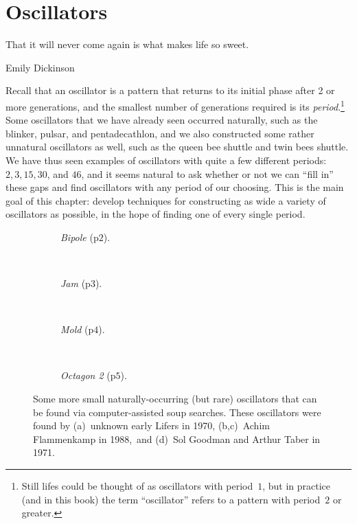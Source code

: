 
\renewcommand{\chapterfolder}{oscillators/}
\chapter{Oscillators}\label{chp:oscillators}


\vspace*{-0.4in}
\epigraph{That it will never come again is what makes life so sweet.}{Emily Dickinson}
\vspace*{0.4in}


\noindent Recall that an oscillator is a pattern that returns to its initial phase after 2 or more generations, and the smallest number of generations required is its \emph{period}.\footnote{Still lifes could be thought of as oscillators with period~$1$, but in practice (and in this book) the term ``oscillator'' refers to a pattern with period~$2$ or greater.} Some oscillators that we have already seen occurred naturally, such as the blinker, pulsar, and pentadecathlon, and we also constructed some rather unnatural oscillators as well, such as the queen bee shuttle and twin bees shuttle. We have thus seen examples of oscillators with quite a few different periods: $2, 3, 15, 30$, and $46$, and it seems natural to ask whether or not we can ``fill in'' these gaps and find oscillators with any period of our choosing. This is the main goal of this chapter: develop techniques for constructing as wide a variety of oscillators as possible, in the hope of finding one of every single period.

\begin{figure}[!htb]
	\centering
	\begin{subfigure}{.2\textwidth}
		\centering
		\caption{\emph{Bipole} (p$2$).}
		\label{fig:bipole}
	\end{subfigure} \ \ \ \ %
	\begin{subfigure}{.2\textwidth}
		\centering
		\caption{\emph{Jam} (p$3$).}
		\label{fig:jam}
	\end{subfigure} \ \ \ \ %
	\begin{subfigure}{.2\textwidth}
		\centering
		\caption{\emph{Mold} (p$4$).}
		\label{fig:mold}
	\end{subfigure} \ \ \ \ %
	\begin{subfigure}{.23\textwidth}
		\centering
		\caption{\emph{Octagon 2} (p$5$).}
		\label{fig:octagon_2}
	\end{subfigure}
	\caption{Some more small naturally-occurring (but rare) oscillators that can be found via computer-assisted soup searches. These oscillators were found by (a)~unknown early Lifers in 1970, (b,c)~Achim Flammenkamp in 1988,\protect\footnotemark \ and (d)~Sol Goodman and Arthur Taber in 1971.}\label{fig:natural_but_rare_oscillators}
\end{figure}

